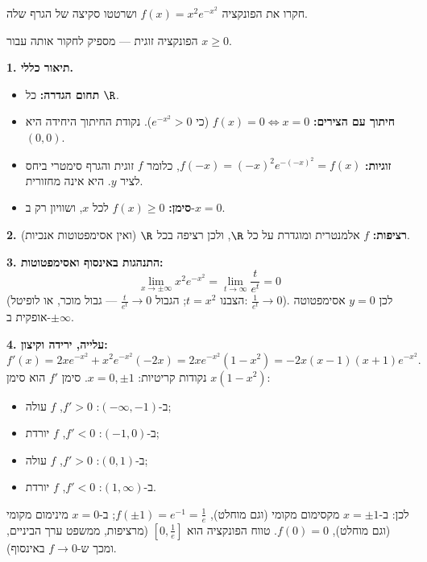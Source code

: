 
\begin{question}
חקרו את הפונקציה $f(x)=x^2e^{-x^2}$ ושרטטו סקיצה של הגרף שלה.
\end{question}

\begin{hint}
הפונקציה זוגית — מספיק לחקור אותה עבור $x\ge0$.
\end{hint}

\begin{solution}
\textbf{1. תיאור כללי.}
\begin{itemize}
  \item \textbf{תחום הגדרה:} כל $\R$.
  \item \textbf{חיתוך עם הצירים:} $f(x)=0\iff x=0$ (כי $e^{-x^2}>0$). נקודת החיתוך היחידה היא $(0,0)$.
  \item \textbf{זוגיות:} $f(-x)=(-x)^2e^{-(-x)^2}=f(x)$, כלומר $f$ זוגית והגרף סימטרי ביחס לציר $y$. היא אינה מחזורית.
  \item \textbf{סימן:} $f(x)\ge0$ לכל $x$, ושוויון רק ב-$x=0$.
\end{itemize}

\textbf{2. רציפות:} $f$ אלמנטרית ומוגדרת על כל $\R$, ולכן רציפה בכל $\R$ (ואין אסימפטוטות אנכיות).

\textbf{3. התנהגות באינסוף ואסימפטוטות:}
\[ \lim_{x\to\pm\infty}x^2e^{-x^2}=\lim_{t\to\infty}\frac{t}{e^t}=0 \]
(הצבנו $t=x^2$; הגבול $\frac{t}{e^t}\to0$ — גבול מוכר, או לופיטל: $\frac{1}{e^t}\to0$). לכן $y=0$ אסימפטוטה אופקית ב-$\pm\infty$.

\textbf{4. עלייה, ירידה וקיצון:}
\[ f'(x)=2xe^{-x^2}+x^2e^{-x^2}(-2x)=2xe^{-x^2}(1-x^2)=-2x(x-1)(x+1)e^{-x^2}. \]
נקודות קריטיות: $x=0,\pm1$. סימן $f'$ הוא סימן $x(1-x^2)$:
\begin{itemize}
  \item ב-$(-\infty,-1)$: $f'>0$, $f$ עולה;
  \item ב-$(-1,0)$: $f'<0$, $f$ יורדת;
  \item ב-$(0,1)$: $f'>0$, $f$ עולה;
  \item ב-$(1,\infty)$: $f'<0$, $f$ יורדת.
\end{itemize}
לכן: ב-$x=\pm1$ מקסימום מקומי (וגם מוחלט), $f(\pm1)=e^{-1}=\frac1e$; ב-$x=0$ מינימום מקומי (וגם מוחלט), $f(0)=0$. טווח הפונקציה הוא $\left[0,\frac1e\right]$ (מרציפות, ממשפט ערך הביניים, ומכך ש-$f\to0$ באינסוף).


\end{solution}
